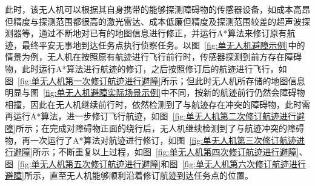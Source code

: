 此时，该无人机可以根据其自身携带的能够探测障碍物的传感器设备，如成本高昂但精度与探测范围都很高的激光雷达、成本低廉但精度及探测范围较差的超声波探测器等，通过不断地对已有的地图信息进行修正，并运行A*算法来修订原有航迹，最终平安无事地到达任务点执行侦察任务。以图~\ref{fig:单无人机避障示例}中的情景为例，无人机在按照原有航迹进行飞行前行时，传感器探测到前方存在障碍物，此时运行A*算法进行航迹的修订，之后按照修订后的航迹进行飞行，如图~\ref{fig:单无人机第一次修订航迹进行避障}所示；但此时无人机所存储的地图信息明显与图~\ref{fig:单无人机避障实际场景示例}中不同，按新的航迹前行仍然会障碍物相撞，因此在无人机继续前行时，依然检测到了与航迹存在冲突的障碍物，此时需再运行A*算法，进一步修订飞行航迹，如图~\ref{fig:单无人机第二次修订航迹进行避障}所示；在完成对障碍物正面的绕行后，无人机继续检测到了与航迹冲突的障碍物，再一次运行了A*算法对航迹进行修订，如图~\ref{fig:单无人机第三次修订航迹进行避障}所示；不断重复以上过程，如图~\ref{fig:单无人机第四次修订航迹进行避障}、图~\ref{fig:单无人机第五次修订航迹进行避障}和图~\ref{fig:单无人机第六次修订航迹进行避障}所示，直至无人机能够顺利沿着修订航迹到达任务点的位置。

